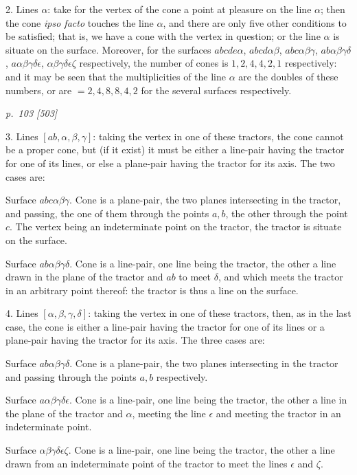 \documentclass[11pt,a4paper]{article}
\newcommand{\sourcepage}[2]{%
  \bigskip
  \noindent\textit{p.~#1 [#2]}%
  \par\smallskip
}
\begin{document}
2\textdegree. Lines $\alpha$: take for the vertex of the cone a point at pleasure on
the line $\alpha$; then the cone \textit{ipso facto} touches the line $\alpha$, and
there are only five other conditions to be satisfied; that is, we have a cone with
the vertex in question; or the line $\alpha$ is situate on the surface. Moreover, for
the surfaces $abcde\alpha$, $abcd\alpha\beta$, $abc\alpha\beta\gamma$,
$ab\alpha\beta\gamma\delta$, $a\alpha\beta\gamma\delta\epsilon$,
$\alpha\beta\gamma\delta\epsilon\zeta$ respectively, the number of cones is
$1,2,4,4,2,1$ respectively: and it may be seen that the multiplicities of the line
$\alpha$ are the doubles of these numbers, or are $=2,4,8,8,4,2$ for the several
surfaces respectively.

\sourcepage{103}{503}
3\textdegree. Lines $[ab,\alpha,\beta,\gamma]$: taking the vertex in one of these
tractors, the cone cannot be a proper cone, but (if it exist) it must be either a
line-pair having the tractor for one of its lines, or else a plane-pair having the
tractor for its axis. The two cases are:

Surface $abc\alpha\beta\gamma$. Cone is a plane-pair, the two planes intersecting
in the tractor, and passing, the one of them through the points $a,b$, the other
through the point $c$. The vertex being an indeterminate point on the tractor, the
tractor is situate on the surface.

Surface $ab\alpha\beta\gamma\delta$. Cone is a line-pair, one line being the
tractor, the other a line drawn in the plane of the tractor and $ab$ to meet
$\delta$, and which meets the tractor in an arbitrary point thereof: the tractor is
thus a line on the surface.

4\textdegree. Lines $[\alpha,\beta,\gamma,\delta]$: taking the vertex in one of
these tractors, then, as in the last case, the cone is either a line-pair having the
tractor for one of its lines or a plane-pair having the tractor for its axis. The three
cases are:

Surface $ab\alpha\beta\gamma\delta$. Cone is a plane-pair, the two planes
intersecting in the tractor and passing through the points $a,b$ respectively.

Surface $a\alpha\beta\gamma\delta\epsilon$. Cone is a line-pair, one line being
the tractor, the other a line in the plane of the tractor and $\alpha$, meeting the
line $\epsilon$ and meeting the tractor in an indeterminate point.

Surface $\alpha\beta\gamma\delta\epsilon\zeta$. Cone is a line-pair, one line
being the tractor, the other a line drawn from an indeterminate point of the tractor
to meet the lines $\epsilon$ and $\zeta$.
\end{document}
